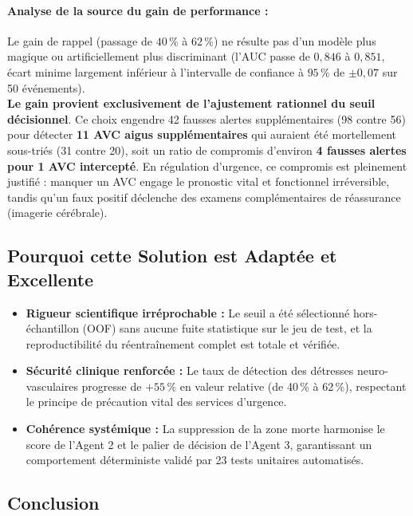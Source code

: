 \paragraph{Analyse de la source du gain de performance :}
Le gain de rappel (passage de $40\,\%$ à $62\,\%$) ne résulte pas d'un modèle plus magique ou artificiellement plus discriminant (l'AUC passe de $0{,}846$ à $0{,}851$, écart minime largement inférieur à l'intervalle de confiance à $95\,\%$ de $\pm 0{,}07$ sur 50 événements). \\
\textbf{Le gain provient exclusivement de l'ajustement rationnel du seuil décisionnel}. Ce choix engendre 42 fausses alertes supplémentaires (98 contre 56) pour détecter \textbf{11 AVC aigus supplémentaires} qui auraient été mortellement sous-triés (31 contre 20), soit un ratio de compromis d'environ \textbf{4 fausses alertes pour 1 AVC intercepté}. En régulation d'urgence, ce compromis est pleinement justifié : manquer un AVC engage le pronostic vital et fonctionnel irréversible, tandis qu'un faux positif déclenche des examens complémentaires de réassurance (imagerie cérébrale).

\subsection{Pourquoi cette Solution est Adaptée et Excellente}

\begin{itemize}
    \item \textbf{Rigueur scientifique irréprochable :} Le seuil a été sélectionné hors-échantillon (OOF) sans aucune fuite statistique sur le jeu de test, et la reproductibilité du réentraînement complet est totale et vérifiée.
    \item \textbf{Sécurité clinique renforcée :} Le taux de détection des détresses neuro-vasculaires progresse de $+55\,\%$ en valeur relative (de 40\,\% à 62\,\%), respectant le principe de précaution vital des services d'urgence.
    \item \textbf{Cohérence systémique :} La suppression de la zone morte harmonise le score de l'Agent 2 et le palier de décision de l'Agent 3, garantissant un comportement déterministe validé par 23 tests unitaires automatisés.
\end{itemize}

\subsection{Conclusion}

